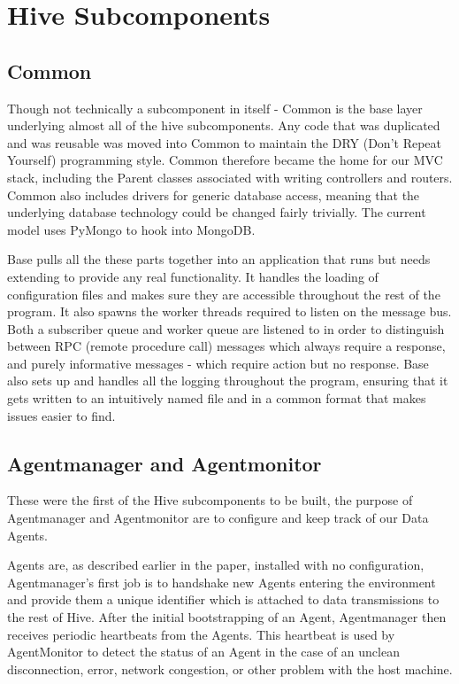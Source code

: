 \section{Hive Subcomponents} \subsection{Common}

Though not technically a subcomponent in itself - Common is the base layer
underlying almost all of the hive subcomponents. Any code that was duplicated
and was reusable was moved into Common to maintain the DRY (Don’t Repeat
Yourself) programming style. Common therefore became the home for our MVC stack,
including the Parent classes associated with writing controllers and routers.
Common also includes drivers for generic database access, meaning that the
underlying database technology could be changed fairly trivially. The current
model uses PyMongo\cite{pymongo} to hook into MongoDB.

Base pulls all the these parts together into an application that runs but needs
extending to provide any real functionality. It handles the loading of
configuration files and makes sure they are accessible throughout the rest of
the program. It also spawns the worker threads required to listen on the message
bus. Both a subscriber queue and worker queue are listened to in order to
distinguish between RPC (remote procedure call) messages which always require a
response, and purely informative messages - which require action but no
response. Base also sets up and handles all the logging throughout the program,
ensuring that it gets written to an intuitively named file and in a common
format that makes issues easier to find.

\subsection{Agentmanager and Agentmonitor}

These were the first of the Hive subcomponents to be built, the purpose of
Agentmanager and Agentmonitor are to configure and keep track of our Data
Agents.

Agents are, as described earlier in the paper, installed with no configuration,
Agentmanager’s first job is to handshake new Agents entering the environment and
provide them a unique identifier which is attached to data transmissions to the
rest of Hive. After the initial bootstrapping of an Agent, Agentmanager then
receives periodic heartbeats from the Agents. This heartbeat is used by
AgentMonitor to detect the status of an Agent in the case of an unclean
disconnection, error, network congestion, or other problem with the host
machine.

